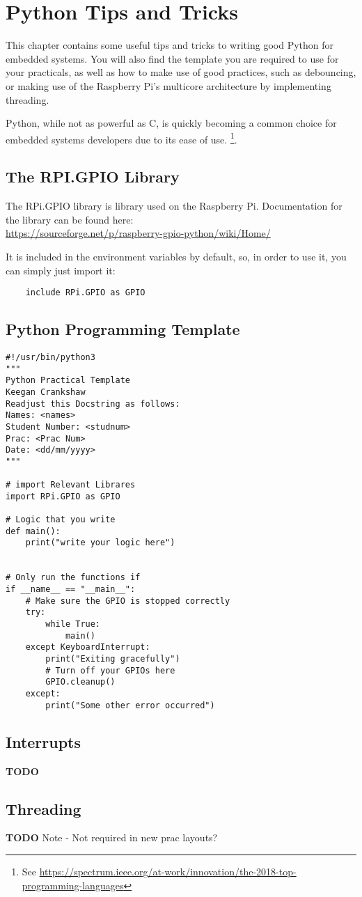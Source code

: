 \section{Python Tips and Tricks}
\label{app:Python}
This chapter contains some useful tips and tricks to writing good Python for embedded systems. You will also find the template you are required to use for your practicals, as well as how to make use of good practices, such as debouncing, or making use of the Raspberry Pi's multicore architecture by implementing threading.

Python, while not as powerful as C, is quickly becoming a common choice for embedded systems developers due to its ease of use. \footnote{See \href{https://spectrum.ieee.org/at-work/innovation/the-2018-top-programming-languages}{https://spectrum.ieee.org/at-work/innovation/the-2018-top-programming-languages}}. 

\subsection{The RPI.GPIO Library}
The RPi.GPIO library is library used on the Raspberry Pi. 
Documentation for the library can be found here:\\
\href{https://sourceforge.net/p/raspberry-gpio-python/wiki/Home/}{https://sourceforge.net/p/raspberry-gpio-python/wiki/Home/}

It is included in the environment variables by default, so, in order to use it, you can simply just import it:

\begin{verbatim}
    include RPi.GPIO as GPIO
\end{verbatim}

\subsection{Python Programming Template}
\begin{lstlisting}
#!/usr/bin/python3
"""
Python Practical Template
Keegan Crankshaw
Readjust this Docstring as follows:
Names: <names>
Student Number: <studnum>
Prac: <Prac Num>
Date: <dd/mm/yyyy>
"""

# import Relevant Librares
import RPi.GPIO as GPIO

# Logic that you write
def main():
    print("write your logic here")


# Only run the functions if 
if __name__ == "__main__":
	# Make sure the GPIO is stopped correctly
	try:
	    while True:
		    main()
	except KeyboardInterrupt:
		print("Exiting gracefully")
		# Turn off your GPIOs here
		GPIO.cleanup()
	except:
		print("Some other error occurred")

\end{lstlisting}

\subsection{Interrupts}
\textbf{TODO}

\subsection{Threading}
\textbf{TODO}
Note - Not required in new prac layouts?

